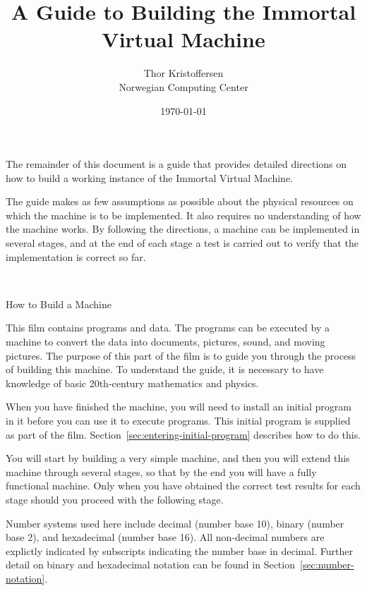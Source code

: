 \documentclass[a4paper,12pt]{article}
\author{Thor Kristoffersen\\Norwegian Computing Center}
\date{\today}
\title{A Guide to Building the Immortal Virtual Machine}
\theoremstyle{definition}
\begin{document}
\maketitle

\noindent
The remainder of this document is a guide that provides detailed directions on how to build a working instance of the Immortal Virtual Machine.

The guide makes as few assumptions as possible about the physical resources on which the machine is to be implemented.
It also requires no understanding of how the machine works.
By following the directions, a machine can be implemented in several stages, and at the end of each stage a test is carried out to verify that the implementation is correct so far.

\thispagestyle{empty}
\newpage

~
\thispagestyle{empty}
\newpage
\setcounter{page}{1}

\begin{center}
  \Large{How to Build a Machine}
\end{center}
\vspace{1em}

\noindent
This film contains programs and data.
The programs can be executed by a machine to convert the data into documents, pictures, sound, and moving pictures.
The purpose of this part of the film is to guide you through the process of building this machine.
To understand the guide, it is necessary to have knowledge of basic 20th-century mathematics and physics.

When you have finished the machine, you will need to install an initial program in it before you can use it to execute programs.
This initial program is supplied as part of the film.
Section~\ref{sec:entering-initial-program} describes how to do this.

You will start by building a very simple machine, and then you will extend this machine through several stages, so that by the end you will have a fully functional machine.
Only when you have obtained the correct test results for each stage should you proceed with the following stage.

Number systems used here include decimal (number base 10), binary (number base 2), and hexadecimal (number base 16).
All non-decimal numbers are explictly indicated by subscripts indicating the number base in decimal.
Further detail on binary and hexadecimal notation can be found in Section~\ref{sec:number-notation}.
\end{document}
